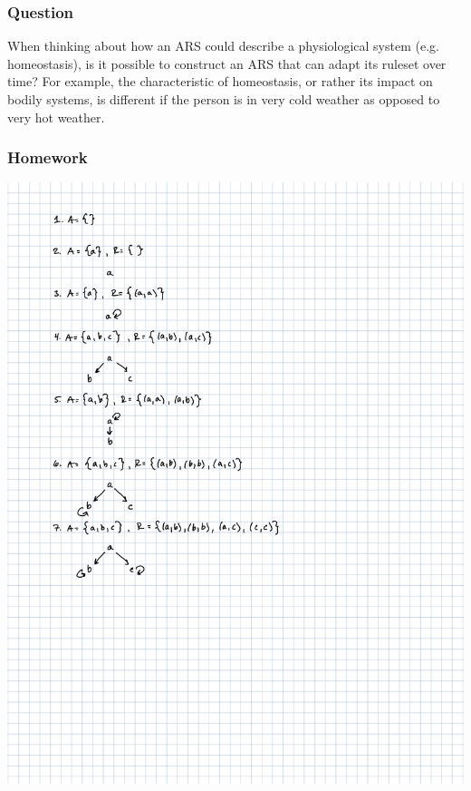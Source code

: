 \documentclass{article}
\theoremstyle{theorem}
\theoremstyle{definition}
\theoremstyle{remark}
\begin{document}
\subsubsection*{Question} When thinking about how an ARS could describe a physiological system (e.g. homeostasis), is it possible to construct an ARS that can adapt its ruleset over time? For example, the characteristic of homeostasis, or rather its impact on bodily systems, is different if the person is in very cold weather as opposed to very hot weather.

\subsubsection*{Homework}

\begin{center}
  \includegraphics[scale=.75]{CPSC354 HW11-1.png}\\

\end{center}
\end{document}
